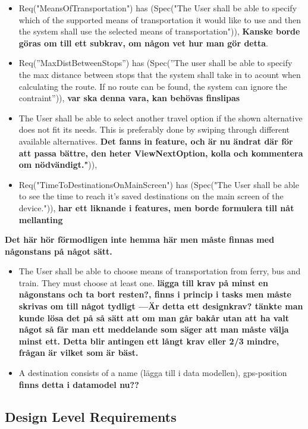 \documentclass[a4paper]{article}
\begin{document}
				\begin{itemize}
					\item Req("MeansOfTransportation") has (Spec("The User shall be able to specify which of the supported means of transportation it would like to use and then the system shall use the selected means of transportation")), \textbf{Kanske borde göras om till ett subkrav, om någon vet hur man gör detta}. 
					\item Req(''MaxDistBetweenStops'') has (Spec(''The user shall be able to specify the max distance between stops that the system shall take in to acount when calculating the route. If no route can be found, the system can ignore the contraint'')), \textbf{var ska denna vara, kan behövas finslipas}


					\item The User shall be able to select another travel option if the shown alternative does not fit its needs. This 				is preferably done by swiping through different available alternatives. \textbf{Det fanns in feature, och är nu ändrat där för att passa bättre, den heter ViewNextOption, kolla och kommentera om nödvändigt."})),
					\item Req("TimeToDestinationsOnMainScreen") has (Spec("The User shall be able to see the time to reach it's saved destinations on the main screen of the device.")), \textbf{har ett liknande i features, men borde formulera till nåt mellanting}
				\end{itemize}	
					
					
				\textbf{Det här hör förmodligen inte hemma här men måste finnas med någonstans på något sätt.}
				\begin{itemize}
					\item The User shall be able to choose means of transportation from ferry, bus and train. They must choose at least one. \textbf{lägga till krav på minst en någonstans och ta bort resten?, finns i princip i tasks men måste skrivas om till något tydligt ---Är detta ett designkrav? tänkte man kunde lösa det på så sätt att om man går bakår utan att ha valt något så får man ett meddelande som säger att man måste välja minst ett. Detta blir antingen ett långt krav eller 2/3 mindre, frågan är vilket som är bäst.}
					\item A destination consists of a name (lägga till i data modellen), gps-position \textbf{finns detta i datamodel nu??}
				\end{itemize}
	\subsection{Design Level Requirements}
\end{document}
